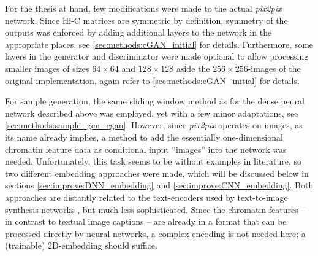 For the thesis at hand, few modifications were made to the actual \emph{pix2pix} network.
Since Hi-C matrices are symmetric by definition, symmetry of the outputs was enforced
by adding additional layers to the network in the appropriate places, see \cref{sec:methods:cGAN_initial} for details.
Furthermore, some layers in the generator and discriminator were made optional to allow processing smaller images of sizes $64\times64$
and $128\times128$ aside the $256\times256$-images of the original implementation, again refer to \cref{sec:methods:cGAN_initial} for details.

For sample generation, the same sliding window method as for the dense neural network described above was employed, 
yet with a few minor adaptations, see \cref{sec:methods:sample_gen_cgan}.
However, since \emph{pix2pix} operates on images, as its name already implies, 
a method to add the essentially one-dimensional chromatin feature data as conditional input ``images'' into the network was needed.
Unfortunately, this task seems to be without examples in literature, so two different embedding approaches were made,
which will be discussed below in sections \ref{sec:improve:DNN_embedding} and \ref{sec:improve:CNN_embedding}.
Both approaches are distantly related to the text-encoders used by text-to-image synthesis networks 
\cite{Reed2016b,Xu2018}, but much less sophisticated. 
Since the chromatin features -- in contrast to textual image captions -- are already in a format that can be processed directly by neural networks,
a complex encoding is not needed here; a (trainable) 2D-embedding should suffice.

